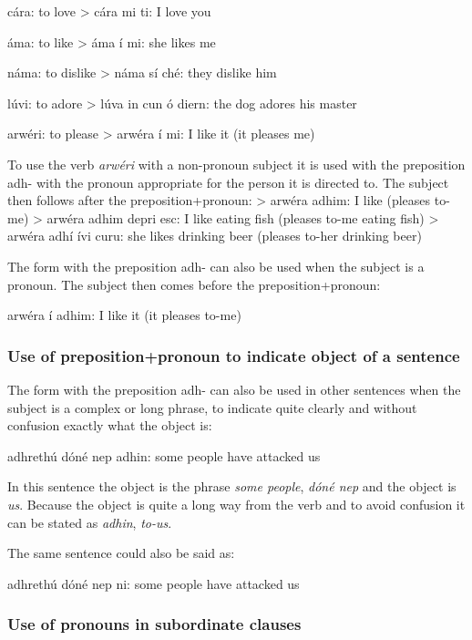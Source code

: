 c\'{a}ra: to love
> c\'{a}ra mi ti: I love you

\'{a}ma: to like
> \'{a}ma \'{i} mi: she likes me

n\'{a}ma: to dislike
> n\'{a}ma s\'{i} ch\'{e}: they dislike him

l\'{u}vi: to adore
> l\'{u}va in cun \'{o} diern: the dog adores his master

arw\'{e}ri: to please
> arw\'{e}ra \'{i} mi: I like it (it pleases me)

To use the verb \textit{arw\'{e}ri} with a non-pronoun subject it is used with the preposition adh- with the pronoun appropriate for the person it is directed to. The subject then follows after the preposition+pronoun:
> arw\'{e}ra adhim: I like (pleases to-me)
> arw\'{e}ra adhim depri esc: I like eating fish (pleases to-me eating fish)
> arw\'{e}ra adh\'{i} \'{i}vi curu: she likes drinking beer (pleases to-her drinking beer)

The form with the preposition adh- can also be used when the subject is a pronoun. The subject then comes before the preposition+pronoun:

arw\'{e}ra \'{i} adhim: I like it (it pleases to-me)

\subsubsection{Use of preposition+pronoun to indicate object of a sentence}

The form with the preposition adh- can also be used in other sentences when the subject is a complex or long phrase, to indicate quite clearly and without confusion exactly what the object is:

adhreth\'{u} d\'{o}n\'{e} nep adhin: some people have attacked us

In this sentence the object is the phrase \textit{some people}, \textit{d\'{o}n\'{e} nep} and the object is \textit{us}. Because the object is quite a long way from the verb and to avoid confusion it can be stated as \textit{adhin}, \textit{to-us}.

The same sentence could also be said as:

adhreth\'{u} d\'{o}n\'{e} nep ni: some people have attacked us

\subsubsection{Use of pronouns in subordinate clauses}


